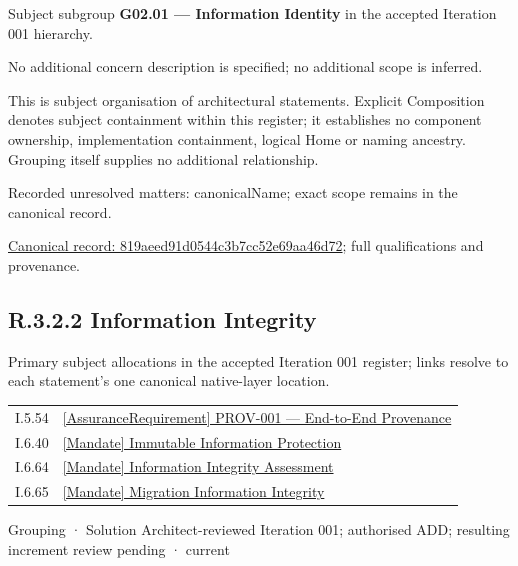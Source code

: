 Subject subgroup \textbf{G02.01 — Information Identity} in the accepted Iteration 001 hierarchy.



No additional concern description is specified; no additional scope is inferred.



This is subject organisation of architectural statements. Explicit Composition denotes subject containment within this register; it establishes no component ownership, implementation containment, logical Home or naming ancestry. Grouping itself supplies no additional relationship.


{\small Recorded unresolved matters: canonicalName; exact scope remains in the canonical record.}\par
{\footnotesize \href{../../../../continuum/grouping/819aeed91d0544c3b7cc52e69aa46d72.md}{Canonical record: 819aeed91d0544c3b7cc52e69aa46d72}; full qualifications and provenance.}\par
\subsection*{R.3.2.2 Information Integrity}
\label{navigation:R.3.2.2}

Primary subject allocations in the accepted Iteration 001 register; links resolve to each statement’s one canonical native-layer location.\par
\begin{longtable}{p{.22\linewidth}p{.73\linewidth}}
I.5.54 & \hyperref[element:3e45e60affb44bf384d54de26d3add6a]{[AssuranceRequirement] PROV-001 — End-to-End Provenance} \\
I.6.40 & \hyperref[element:4a25d9c8aaa9418fbddb5bff7302c46d]{[Mandate] Immutable Information Protection} \\
I.6.64 & \hyperref[element:6316761bfd414032a8d889c7ba34131d]{[Mandate] Information Integrity Assessment} \\
I.6.65 & \hyperref[element:22583ccb89dc4cf683c710760bc4b1f2]{[Mandate] Migration Information Integrity} \\
\end{longtable}
\label{element:eb1b0526b898448688a322cce7ea6e74}
{\small Grouping · Solution Architect-reviewed Iteration 001; authorised ADD; resulting increment review pending · current}\par

